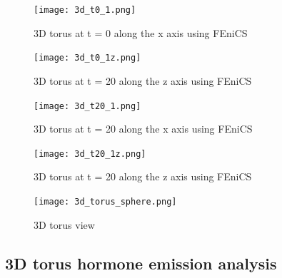 \documentclass[12pt]{article}
\begin{document}
\begin{figure}[H] %
\centering
\texttt{[image: 3d\_t0\_1.png]}
\caption{3D torus at t = 0 along the x axis using FEniCS}
\label{fig:3d_t0_x}
\end{figure}

\begin{figure}[H] %
\centering
\texttt{[image: 3d\_t0\_1z.png]}
\caption{3D torus at t = 20 along the z axis using FEniCS}
\label{fig:3d_t0_z}
\end{figure}

\begin{figure}[H] %
\centering
\texttt{[image: 3d\_t20\_1.png]}
\caption{3D torus at t = 20 along the x axis using FEniCS}
\label{fig:3d_t20_x}
\end{figure}

\begin{figure}[H] %
\centering
\texttt{[image: 3d\_t20\_1z.png]}
\caption{3D torus at t = 20 along the z axis using FEniCS}
\label{fig:3d_t20_z}
\end{figure}

\begin{figure}[H] %
\centering
\texttt{[image: 3d\_torus\_sphere.png]}
\caption{3D torus view}
\label{fig:3d_torus}
\end{figure}


\subsection{3D torus hormone emission analysis}
\end{document}

